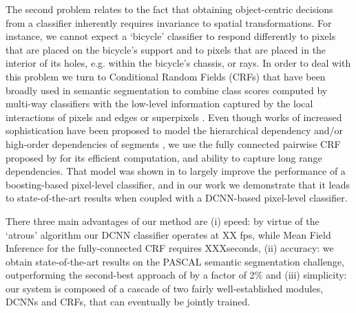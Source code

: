 The second problem relates to the fact that obtaining object-centric decisions from a classifier inherently requires invariance to spatial transformations. For instance, we cannot expect a `bicycle' classifier to respond differently to pixels that are  placed on the bicycle's support and to pixels that are placed in the interior of its holes, e.g. within the bicycle's chassis, or rays. In order to deal with this problem we turn to  Conditional Random Fields (CRFs) that have been broadly used in semantic segmentation to combine class scores computed by multi-way classifiers with the low-level information captured by the local interactions of   pixels and edges \citep{rother2004grabcut, shotton2009textonboost} or superpixels \citep{lucchi2011spatial}. Even though works of increased sophistication have been proposed 
 to model the hierarchical dependency \citep{he2004multiscale, ladicky2009associative, lempitsky2011pylon} and/or  high-order dependencies of segments \citep{delong2012fast, gonfaus2010harmony, kohli2009robust}, we use the  fully connected pairwise CRF proposed by \citet{krahenbuhl2011efficient} for its efficient computation, and ability to capture  long range dependencies. That model was shown in  \citet{krahenbuhl2011efficient} to largely improve the performance of a boosting-based pixel-level classifier, and in our work we demonstrate that it leads to state-of-the-art results when coupled with a DCNN-based pixel-level classifier. 


There  three main advantages of our method are (i) speed: by virtue of the `atrous' algorithm our DCNN classifier operates at XX fps, while Mean Field Inference for the fully-connected CRF requires XXXseconds, (ii) accuracy: we obtain state-of-the-art results on the PASCAL semantic segmentation challenge, outperforming the second-best approach of \citet{mostajabi2014feedforward} by a factor of 2$\%$ and (iii) simplicity: our system is composed of a cascade of two fairly well-established modules, DCNNs and CRFs, that can eventually be jointly trained. 


